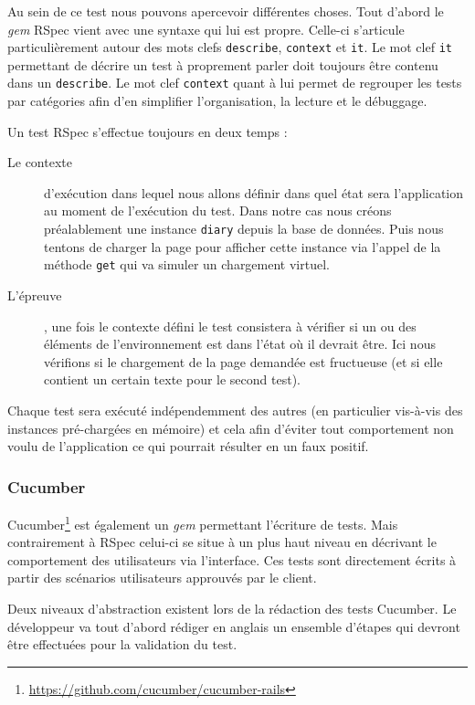 \documentclass[12pt,a4paper]{book}
\begin{document}
Au sein de ce test nous pouvons apercevoir différentes choses. Tout d'abord le \textit{gem} RSpec vient avec une syntaxe qui lui est propre. Celle-ci s'articule particulièrement autour des mots clefs \texttt{describe}, \texttt{context} et \texttt{it}. Le mot clef \texttt{it} permettant de décrire un test à proprement parler doit toujours être contenu dans un \texttt{describe}. Le mot clef \texttt{context} quant à lui permet de regrouper les tests par catégories afin d'en simplifier l'organisation, la lecture et le débuggage.

Un test RSpec s'effectue toujours en deux temps :
\begin{description}
	\item[Le contexte] d'exécution dans lequel nous allons définir dans quel état sera l'application au moment de l'exécution du test. Dans notre cas nous créons préalablement une instance \texttt{diary} depuis la base de données. Puis nous tentons de charger la page pour afficher cette instance via l'appel de la méthode \texttt{get} qui va simuler un chargement virtuel.
	\item[L'épreuve], une fois le contexte défini le test consistera à vérifier si un ou des éléments de l'environnement est dans l'état où il devrait être. Ici nous vérifions si le chargement de la page demandée est fructueuse (et si elle contient un certain texte pour le second test).
\end{description}

Chaque test sera exécuté indépendemment des autres (en particulier vis-à-vis des instances pré-chargées en mémoire) et cela afin d'éviter tout comportement non voulu de l'application ce qui pourrait résulter en un faux positif.

\subsubsection{Cucumber}

Cucumber\footnote{\url{https://github.com/cucumber/cucumber-rails}} est également un \textit{gem} permettant l'écriture de tests. Mais contrairement à RSpec celui-ci se situe à un plus haut niveau en décrivant le comportement des utilisateurs via l'interface. Ces tests sont directement écrits à partir des scénarios utilisateurs approuvés par le client.

Deux niveaux d'abstraction existent lors de la rédaction des tests Cucumber. Le développeur va tout d'abord rédiger en anglais un ensemble d'étapes qui devront être effectuées pour la validation du test.
\end{document}
